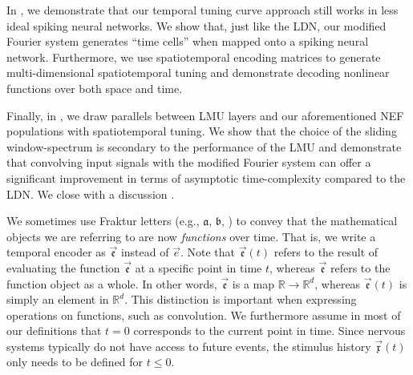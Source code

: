In , we demonstrate that our temporal tuning curve approach still works in less ideal spiking neural networks.
We show that, just like the LDN, our modified Fourier system generates \enquote{time cells} when mapped onto a spiking neural network.
Furthermore, we use spatiotemporal encoding matrices to generate multi-dimensional spatiotemporal tuning and demonstrate decoding nonlinear functions over both space and time.

Finally, in , we draw parallels between LMU layers and our aforementioned NEF populations with spatiotemporal tuning.
We show that the choice of the sliding window-spectrum is secondary to the performance of the LMU and demonstrate that convolving input signals with the modified Fourier system can offer a significant improvement in terms of asymptotic time-complexity compared to the LDN.
We close with a discussion .

\begin{Notation}
We sometimes use Fraktur letters (e.g., $\mathfrak{a}$, $\mathfrak{b}$, \textellipsis) to convey that the mathematical objects we are referring to are now \emph{functions} over time.
That is, we write a temporal encoder as $\vec{\mathfrak{e}}$ instead of $\vec e$.
Note that $\vec{\mathfrak{e}}(t)$ refers to the result of evaluating the function $\vec{\mathfrak{e}}$ at a specific point in time $t$, whereas $\vec{\mathfrak{e}}$ refers to the function object as a whole.
In other words, $\vec{\mathfrak{e}}$ is a map $\mathbb{R} \longrightarrow \mathbb{R}^d$, whereas $\vec{\mathfrak{e}}(t)$ is simply an element in $\mathbb{R}^d$.
This distinction is important when expressing operations on functions, such as convolution.
We furthermore assume in most of our definitions that $t = 0$ corresponds to the current point in time.
Since nervous systems typically do not have access to future events, the stimulus history $\vec{\mathfrak{x}}(t)$ only needs to be defined for $t \leq 0$.
\end{Notation}
